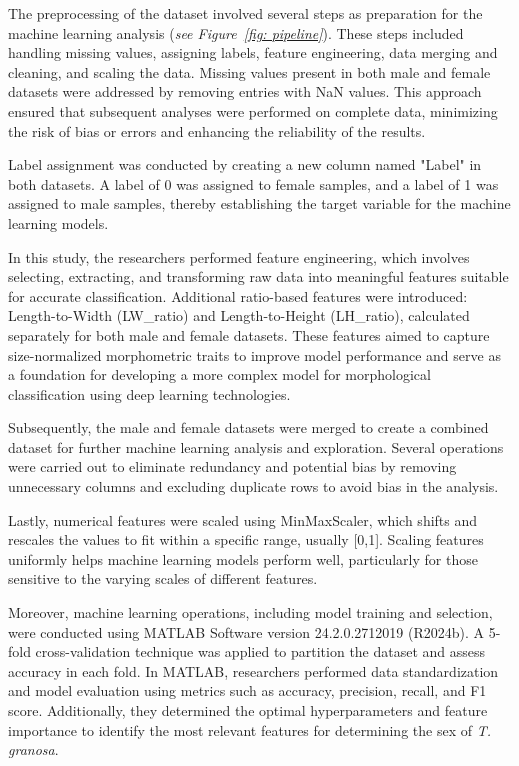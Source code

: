 The preprocessing of the dataset involved several steps as preparation for the machine learning analysis (\textit{see Figure~\ref{fig: pipeline}}). These steps included handling missing values, assigning labels, feature engineering, data merging and cleaning, and scaling the data. Missing values present in both male and female datasets were addressed by removing entries with NaN values. This approach ensured that subsequent analyses were performed on complete data, minimizing the risk of bias or errors and enhancing the reliability of the results.

Label assignment was conducted by creating a new column named "Label" in both datasets. A label of 0 was assigned to female samples, and a label of 1 was assigned to male samples, thereby establishing the target variable for the machine learning models.

In this study, the researchers performed feature engineering, which involves selecting, extracting, and transforming raw data into meaningful features suitable for accurate classification. Additional ratio-based features were introduced: Length-to-Width (LW\_ratio) and Length-to-Height (LH\_ratio), calculated separately for both male and female datasets. These features aimed to capture size-normalized morphometric traits to improve model performance and serve as a foundation for developing a more complex model for morphological classification using deep learning technologies.

Subsequently, the male and female datasets were merged to create a combined dataset for further machine learning analysis and exploration. Several operations were carried out to eliminate redundancy and potential bias by removing unnecessary columns and excluding duplicate rows to avoid bias in the analysis.

Lastly, numerical features were scaled using MinMaxScaler, which shifts and rescales the values to fit within a specific range, usually [0,1]. Scaling features uniformly helps machine learning models perform well, particularly for those sensitive to the varying scales of different features.

Moreover, machine learning operations, including model training and selection, were conducted using MATLAB Software version 24.2.0.2712019 (R2024b). A 5-fold cross-validation technique was applied to partition the dataset and assess accuracy in each fold. In MATLAB, researchers performed data standardization and model evaluation using metrics such as accuracy, precision, recall, and F1 score. Additionally, they determined the optimal hyperparameters and feature importance to identify the most relevant features for determining the sex of \textit{T. granosa}.



